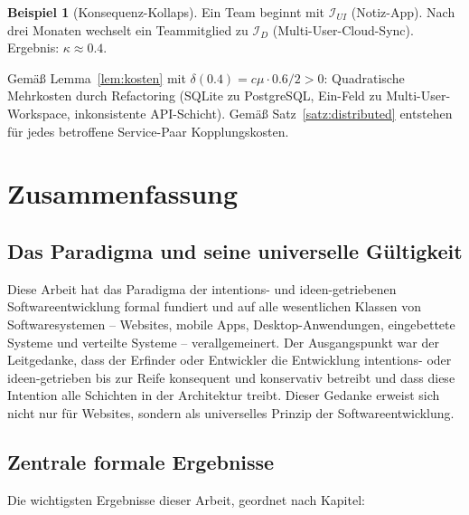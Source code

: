 ﻿\documentclass[a4paper,12pt]{article}
\theoremstyle{definition}
\newtheorem{beispiel}{Beispiel}
\begin{document}
\begin{beispiel}[Konsequenz-Kollaps]\label{bsp:inkonsistenz}
Ein Team beginnt mit $\mathcal{I}_{UI}$ (Notiz-App). Nach drei Monaten
wechselt ein Teammitglied zu $\mathcal{I}_D$ (Multi-User-Cloud-Sync).
Ergebnis: $\kappa \approx 0.4$.

Gemäß Lemma~\ref{lem:kosten} mit $\delta(0.4) = c\mu \cdot 0.6/2 > 0$:
Quadratische Mehrkosten durch Refactoring (SQLite zu PostgreSQL,
Ein-Feld zu Multi-User-Workspace, inkonsistente API-Schicht).
Gemäß Satz~\ref{satz:distributed} entstehen für jedes betroffene
Service-Paar Kopplungskosten.
\end{beispiel}

\section{Zusammenfassung}

\subsection{Das Paradigma und seine universelle Gültigkeit}

Diese Arbeit hat das Paradigma der intentions- und ideen-getriebenen
Softwareentwicklung formal fundiert und auf alle wesentlichen Klassen
von Softwaresystemen -- Websites, mobile Apps, Desktop-Anwendungen,
eingebettete Systeme und verteilte Systeme -- verallgemeinert. Der
Ausgangspunkt war der Leitgedanke, dass der Erfinder oder Entwickler
die Entwicklung intentions- oder ideen-getrieben bis zur Reife konsequent
und konservativ betreibt und dass diese Intention alle Schichten in der
Architektur treibt. Dieser Gedanke erweist sich nicht nur für Websites,
sondern als universelles Prinzip der Softwareentwicklung.

\subsection{Zentrale formale Ergebnisse}

Die wichtigsten Ergebnisse dieser Arbeit, geordnet nach Kapitel:
\end{document}
